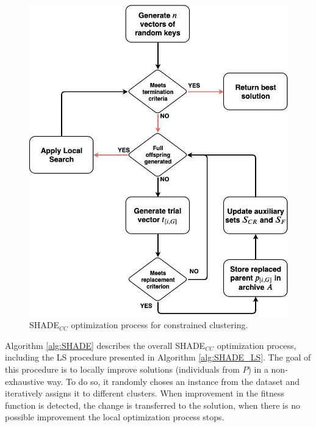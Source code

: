 \begin{figure}[!h]
	\centering
	\includegraphics[scale=0.4]{gfx/NewProp/SHADE/SHADE_Diagram.jpg} 
	\caption[SHADE$_{CC}$ optimization process for constrained clustering.]{\acs{SHADE}$_{CC}$ optimization process for constrained clustering.}\label{fig:SHADE_CC}
\end{figure}

Algorithm \ref{alg:SHADE} describes the overall \acs{SHADE}$_{CC}$ optimization process, including the \acs{LS} procedure presented in Algorithm \ref{alg:SHADE_LS}. The goal of this procedure is to locally improve solutions (individuals from $P$) in a non-exhaustive way. To do so, it randomly choses an instance from the dataset and iteratively assigns it to different clusters. When improvement in the fitness function is detected, the change is transferred to the solution, when there is no possible improvement the local optimization process stops.

